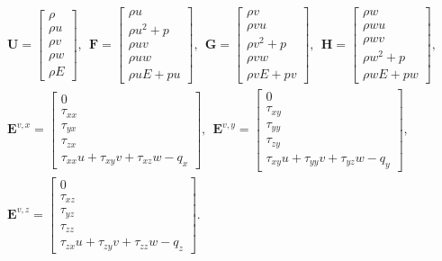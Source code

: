 {\normalsize
\begin{equation}
    \begin{array}{l}
        \mathbf{U} = \left[\begin{array}{c}\rho \\ \rho u \\ \rho v \\ \rho w \\ \rho E\end{array}\right], ~~
        \mathbf{F} = \left[\begin{array}{c}\rho u \\ \rho u^2 + p \\ \rho u v \\ \rho u w \\ \rho u E + p u\end{array}\right], ~~
        \mathbf{G} = \left[\begin{array}{c}\rho v \\ \rho v u \\ \rho v^2 + p \\ \rho v w \\ \rho v E + p v\end{array}\right], ~~
        \mathbf{H} = \left[\begin{array}{c}\rho w \\ \rho w u \\ \rho w v \\ \rho w^2 + p \\ \rho w E + p w\end{array}\right], \\[4em]
        \mathbf{E}^{v,x} = \left[\begin{array}{c}0 \\ \tau_{xx} \\ \tau_{yx} \\ \tau_{zx} \\ \tau_{xx} u + \tau_{xy} v +\tau_{xz} w - q_x\end{array}\right], ~~
        \mathbf{E}^{v,y} = \left[\begin{array}{c}0 \\ \tau_{xy} \\ \tau_{yy} \\ \tau_{zy} \\ \tau_{xy} u + \tau_{yy} v + \tau_{yz} w - q_y\end{array}\right], \\[4em]
        \mathbf{E}^{v,z} = \left[\begin{array}{c}0 \\ \tau_{xz} \\ \tau_{yz} \\ \tau_{zz} \\ \tau_{zx} u + \tau_{zy} v + \tau_{zz} w - q_z\end{array}\right].
    \end{array}
    \label{eq:cons_ns_vectors}
\end{equation}
}\\

